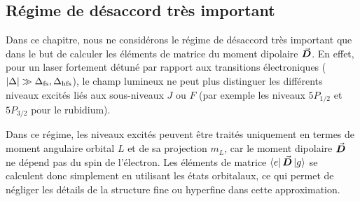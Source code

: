 \subsection{Régime de désaccord très important}

Dans ce chapitre, nous ne considérons le régime de désaccord très important que dans le but de calculer les éléments de matrice du moment dipolaire $\vec{{\bm{D}}}$. En effet, pour un laser fortement détuné par rapport aux transitions électroniques ($|\Delta| \gg \Delta_{\rm fs}, \Delta_{\rm hfs}$), le champ lumineux ne peut plus distinguer les différents niveaux excités liés aux sous-niveaux $J$ ou $F$ (par exemple les niveaux $5P_{1/2}$ et $5P_{3/2}$ pour le rubidium). 

Dans ce régime, les niveaux excités peuvent être traités uniquement en termes de moment angulaire orbital $L$ et de sa projection $m_L$, car le moment dipolaire $\vec{{\bm{D}}}$ ne dépend pas du spin de l’électron. Les éléments de matrice $\bra{e}\vec{{\bm{D}}}\ket{g}$ se calculent donc simplement en utilisant les états orbitalaux, ce qui permet de négliger les détails de la structure fine ou hyperfine dans cette approximation.


